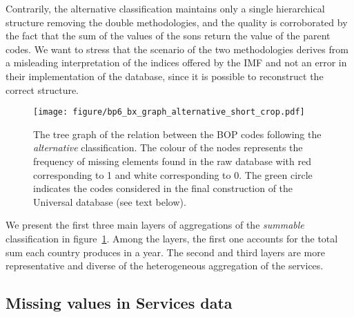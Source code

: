 \documentclass[fleqn,10pt]{article}
\begin{document}
Contrarily, the alternative classification maintains only a single hierarchical structure removing the double methodologies, and the quality is corroborated by the fact that the sum of the values of the sons return the value of the parent codes.
We want to stress that the scenario of the two methodologies derives from a misleading interpretation of the indices offered by the IMF and not an error in their implementation of the database, since it is possible to reconstruct the correct structure.
\begin{figure}[!t]
	\centering
	\texttt{[image: figure/bp6\_bx\_graph\_alternative\_short\_crop.pdf]}
	\caption{The tree graph of the relation between the BOP codes following the \emph{alternative} classification. The colour of the nodes represents the frequency of missing elements found in the raw database with red corresponding to 1 and white corresponding to 0. The green circle indicates the codes considered in the final construction of the Universal database (see text below).}
	\label{fig:net}
\end{figure}
We present the first three main layers of aggregations of the \emph{summable} classification in figure~\ref{fig:net}.
Among the layers, the first one accounts for the total sum each country produces in a year.
The second and third layers are more representative and diverse of the heterogeneous aggregation of the services.

\subsection*{Missing values in Services data}
\end{document}
